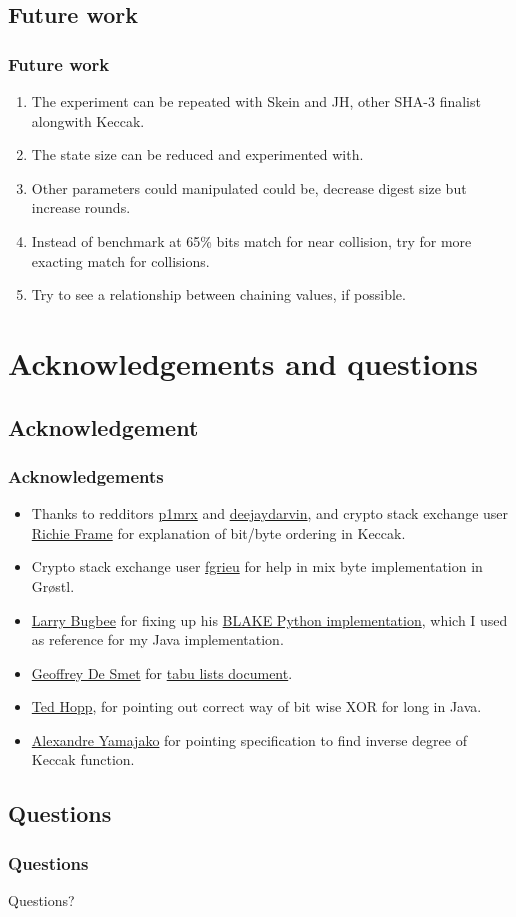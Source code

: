 \documentclass{beamer}
\begin{document}
\subsection{Future work}

\begin{frame}
\frametitle{Future work}
\begin{enumerate}
\item The experiment can be repeated with Skein and JH, other SHA-3 finalist alongwith Keccak.
\item The state size can be reduced and experimented with.
\item Other parameters could manipulated could be, decrease digest size but increase rounds.
\item Instead of benchmark at 65\% bits match for near collision, try for more exacting match
for collisions.
\item Try to see a relationship between chaining values, if possible.
\end{enumerate}
\end{frame}

\section{Acknowledgements and questions}

\subsection{Acknowledgement}

\begin{frame}
\frametitle{Acknowledgements}
\begin{itemize}
\item Thanks to redditors \href{"http://www.reddit.com/user/p1mrx"}{p1mrx} and 
\href{"http://www.reddit.com/user/deejaydarvin"}{deejaydarvin}, and crypto stack exchange user 
\href{"http://crypto.stackexchange.com/users/8050/richie-frame"}{Richie Frame} for explanation of bit/byte 
ordering in Keccak.
\item Crypto stack exchange user \href{"http://crypto.stackexchange.com/users/555/fgrieu"}{fgrieu} for help
in mix byte implementation in Gr{\o}stl.
\item \href{"http://www.seanet.com/~bugbee"}{Larry Bugbee} for fixing up his 
\href{http://www.seanet.com/~bugbee/crypto/blake/}{BLAKE Python implementation}, which I used as reference 
for my Java implementation.
\item \href{"http://stackoverflow.com/users/472109/geoffrey-de-smet"}{Geoffrey De Smet} for 
\href{"http://docs.jboss.org/drools/release/latest/optaplanner-docs/html\_single/index.html\#tabuSearch"}
{tabu lists document}.
\item \href{"http://stackoverflow.com/users/535871/ted-hopp"}{Ted Hopp}, for pointing out correct way
of bit wise XOR for long in Java.
\item \href{"http://crypto.stackexchange.com/users/4136/alexandre-yamajako"}{Alexandre Yamajako} for pointing
specification to find inverse degree of Keccak function.
\end{itemize}
\end{frame}

\subsection{Questions}

\begin{frame}
\frametitle{Questions}
Questions?
\end{frame}
\end{document}

